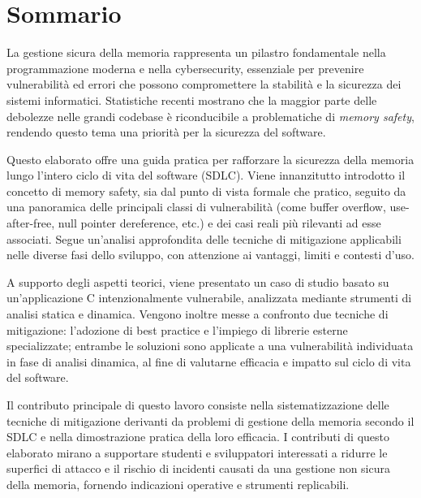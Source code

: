 \chapter*{Sommario}
\label{cha:sommario}

La gestione sicura della memoria rappresenta un pilastro fondamentale nella
programmazione moderna e nella cybersecurity, essenziale per prevenire vulnerabilità
ed errori che possono compromettere la stabilità e la sicurezza dei sistemi informatici.
Statistiche recenti mostrano che la maggior parte delle debolezze nelle grandi
codebase è riconducibile a problematiche di \textit{memory safety}, rendendo
questo tema una priorità per la sicurezza del software.

\vspace{0.5em}
\noindent
Questo elaborato offre una guida pratica per rafforzare la sicurezza della
memoria lungo l'intero ciclo di vita del software (SDLC). Viene innanzitutto introdotto
il concetto di memory safety, sia dal punto di vista formale che pratico, seguito
da una panoramica delle principali classi di vulnerabilità (come buffer overflow,
use-after-free, null pointer dereference, etc.) e dei casi reali più rilevanti ad
esse associati. Segue un'analisi approfondita delle tecniche di mitigazione
applicabili nelle diverse fasi dello sviluppo, con attenzione ai vantaggi,
limiti e contesti d'uso.

\vspace{0.5em}
\noindent
A supporto degli aspetti teorici, viene presentato un caso di studio basato su un'applicazione
C intenzionalmente vulnerabile, analizzata mediante strumenti di analisi statica
e dinamica. Vengono inoltre messe a confronto due tecniche di mitigazione: l'adozione
di best practice e l'impiego di librerie esterne specializzate; entrambe le soluzioni
sono applicate a una vulnerabilità individuata in fase di analisi dinamica, al
fine di valutarne efficacia e impatto sul ciclo di vita del software.

\vspace{0.5em}
\noindent
Il contributo principale di questo lavoro consiste nella sistematizzazione delle
tecniche di mitigazione derivanti da problemi di gestione della memoria secondo
il SDLC e nella dimostrazione pratica della loro efficacia. I contributi di questo
elaborato mirano a supportare studenti e sviluppatori interessati a ridurre le superfici
di attacco e il rischio di incidenti causati da una gestione non sicura della memoria,
fornendo indicazioni operative e strumenti replicabili.